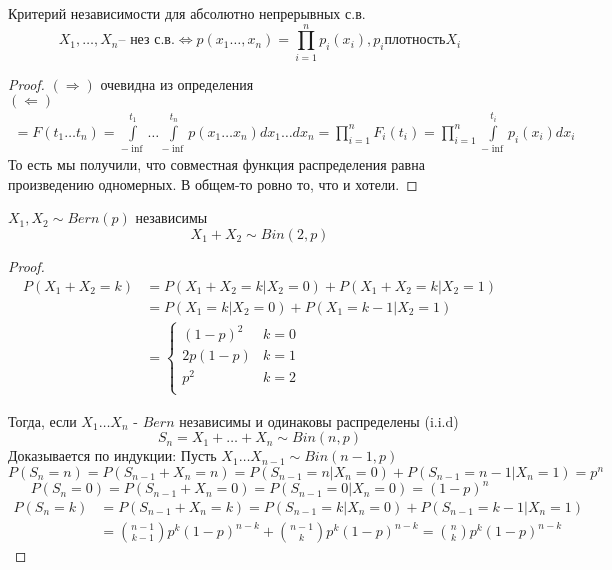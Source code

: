 \documentclass{article}
\begin{document}
    \begin{theorem}{Критерий независимости для абсолютно непрерывных с.в.}
    $$ X_1, \dots, X_n \text{-- нез с.в.} \Leftrightarrow p(x_1 \dots, x_n) = \prod_{i=1}^n p_i(x_i), p_i \text{плотность} X_i$$
    \end{theorem}
    \begin{proof}
    $(\Rightarrow)$ очевидна из определения \\
    $(\Leftarrow)$ 
    \begin{align*}
    = F(t_1\dots t_n) = \int\limits_{-\inf}^{t_1} \dots \int\limits_{-\inf}^{t_n} p(x_1 \dots x_n) dx_1 \dots dx_n = \prod_{i=1}^n F_i(t_i) = \prod_{i=1}^n \int\limits_{-\inf}^{t_i} p_i(x_i) dx_i 
    \end{align*}
    То есть мы получили, что совместная функция распределения равна  произведению одномерных. В общем-то ровно то, что и хотели.
    \end{proof}
    \begin{example}
        $X_1, X_2 \sim Bern(p)$ независимы
        $$ X_1 + X_2 \sim Bin(2, p)$$
        \begin{proof}
            \begin{align*}  
            P(X_1 + X_2 = k) &= P(X_1 + X_2 =k | X_2=0) + P(X_1 + X_2 = k | X_2 = 1) \\ &= P(X_1 = k | X_2=0) +  P(X_1 = k - 1 | X_2 = 1)\\
                &=
                \begin{cases}
                    (1 - p) ^ 2 & k = 0 \\
                    2p(1-p) & k = 1 \\
                    p^2 & k = 2 \\
                \end{cases}
            \end{align*}
            
        Тогда, если $X_1 \dots X_n$ - $Bern$ независимы и одинаковы распределены (i.i.d)
        $$S_n = X_1 + \dots + X_n  \sim Bin(n, p)$$
        Доказывается по индукции:
        Пусть $X_1 \dots X_{n-1} \sim Bin(n - 1, p) $
        $$ P(S_n = n) = P(S_{n-1} + X_n = n) = P(S_{n - 1} = n | X_n = 0) + P(S_{n-1} = n - 1 | X_n = 1) = p^n$$
        $$ P(S_n = 0) = P(S_{n-1} + X_n = 0) = P(S_{n - 1} = 0 | X_n = 0)= (1-p)^n$$
        \begin{align*}
        P(S_n = k) &= P(S_{n-1} + X_n = k) = P(S_{n - 1} = k | X_n = 0) + P(S_{n-1} = k - 1 | X_n = 1) \\ &= \binom{n-1}{k-1} p^{k}(1-p)^{n-k} + \binom{n-1}{k} p^k (1-p)^{n-k} = \binom{n}{k} p^k (1-p)^{n-k}
        \end{align*}
        \end{proof}
    \end{example}
\end{document}
